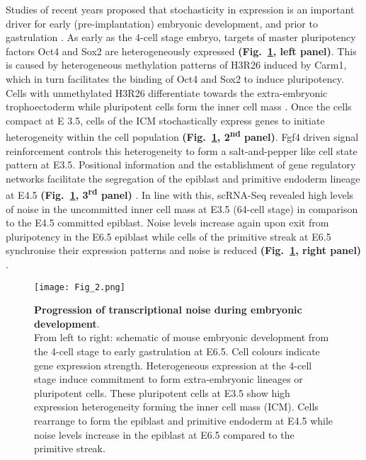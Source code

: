 Studies of recent years proposed that stochasticity in expression is an important driver for early (pre-implantation) embryonic development, and prior to gastrulation \citep{Dietrich2007}. As early as the 4-cell stage embryo, targets of master pluripotency factors Oct4 and Sox2 are heterogeneously expressed \textbf{(Fig.~\ref{fig0:noise_development}, left panel)}. This is caused by heterogeneous methylation patterns of \gls{H3R26} induced by \gls{Carm1}, which in turn facilitates the binding of Oct4 and Sox2 to induce pluripotency. Cells with unmethylated H3R26 differentiate towards the extra-embryonic trophoectoderm while pluripotent cells form the inner cell mass \citep{Goolam2016}. Once the cells compact at \gls{E} 3.5, cells of the \gls{ICM} stochastically express genes to initiate heterogeneity within the cell population \textbf{(Fig.~\ref{fig0:noise_development}, 2\textsuperscript{nd} panel)}. Fgf4 driven signal reinforcement controls this heterogeneity to form a salt-and-pepper like cell state pattern at E3.5. Positional information and the establishment of gene regulatory networks facilitate the segregation of the epiblast and primitive endoderm lineage at E4.5 \textbf{(Fig.~\ref{fig0:noise_development}, 3\textsuperscript{rd} panel)} \citep{Ohnishi2014}. In line with this, scRNA-Seq revealed high levels of noise in the uncommitted inner cell mass at E3.5 (64-cell stage) in comparison to the E4.5 committed epiblast. Noise levels increase again upon exit from pluripotency in the E6.5 epiblast while cells of the primitive streak at E6.5 synchronise their expression patterns and noise is reduced \textbf{(Fig.~\ref{fig0:noise_development}, right panel)} \citep{Mohammed2017}.

\begin{figure}[!h]
\centering
\texttt{[image: Fig\_2.png]}
\caption[Progression of transcriptional heterogeneity during embryonic development]{\textbf{Progression of transcriptional noise during embryonic development}.\\
From left to right: schematic of mouse embryonic development from the 4-cell stage to early gastrulation at E6.5. Cell colours indicate gene expression strength. Heterogeneous expression at the 4-cell stage induce commitment to form extra-embryonic lineages or pluripotent cells. These pluripotent cells at E3.5 show high expression heterogeneity forming the inner cell mass (ICM). Cells rearrange to form the epiblast and primitive endoderm at E4.5 while noise levels increase in the epiblast at E6.5 compared to the primitive streak.}
\label{fig0:noise_development}
\end{figure}

